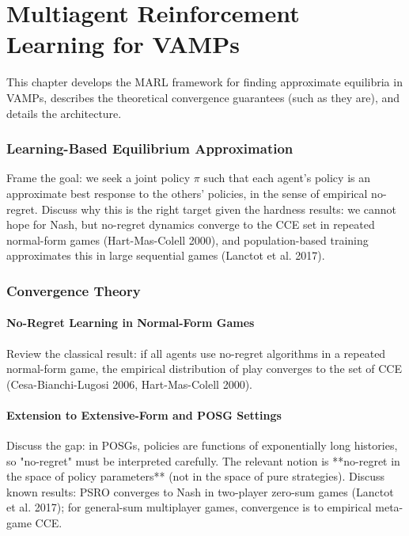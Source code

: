 \chapter{Multiagent Reinforcement Learning for VAMPs}\label{chap:marl}

This chapter develops the MARL framework for finding approximate equilibria in VAMPs, describes the theoretical convergence guarantees (such as they are), and details the architecture.

\subsection{Learning-Based Equilibrium Approximation}
Frame the goal: we seek a joint policy $\pi$ such that each agent's policy is an approximate best response to the others' policies, in the sense of empirical no-regret. Discuss why this is the right target given the hardness results: we cannot hope for Nash, but no-regret dynamics converge to the CCE set in repeated normal-form games (Hart-Mas-Colell 2000), and population-based training approximates this in large sequential games (Lanctot et al. 2017).

\subsection{Convergence Theory}

\subsubsection{No-Regret Learning in Normal-Form Games}
Review the classical result: if all agents use no-regret algorithms in a repeated normal-form game, the empirical distribution of play converges to the set of CCE (Cesa-Bianchi-Lugosi 2006, Hart-Mas-Colell 2000).

\subsubsection{Extension to Extensive-Form and POSG Settings}
Discuss the gap: in POSGs, policies are functions of exponentially long histories, so "no-regret" must be interpreted carefully. The relevant notion is **no-regret in the space of policy parameters** (not in the space of pure strategies). Discuss known results: PSRO converges to Nash in two-player zero-sum games (Lanctot et al. 2017); for general-sum multiplayer games, convergence is to empirical meta-game CCE.

